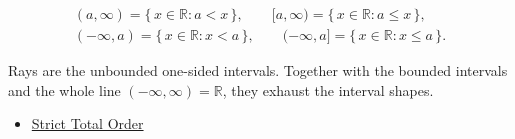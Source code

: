 \begin{remark*}
\[
\begin{gathered}
(a,\infty)=\{\,x\in\mathbb{R}:a<x\,\},\qquad
[a,\infty)=\{\,x\in\mathbb{R}:a\le x\,\},\\
(-\infty,a)=\{\,x\in\mathbb{R}:x<a\,\},\qquad
(-\infty,a]=\{\,x\in\mathbb{R}:x\le a\,\}.
\end{gathered}
\]
\end{remark*}
\begin{remark*}[Interpretation]
Rays are the unbounded one-sided intervals. Together with the bounded intervals and the whole line $(-\infty,\infty)=\mathbb{R}$, they exhaust the interval shapes.
\end{remark*}
\begin{dependencies}
\begin{itemize}
  \item \hyperref[def:strict-total-order]{Strict Total Order}
\end{itemize}
\end{dependencies}
